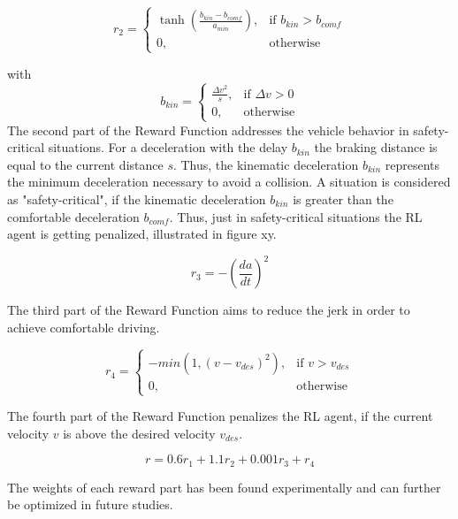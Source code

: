\documentclass[review]{elsarticle}
\begin{document}
\begin{equation}
r_2 = 
\begin{cases}
\tanh\left(\frac{b_{kin}-b_{comf}}{a_{min}}\right),& \text{if } b_{kin}>b_{comf}\\
0,              & \text{otherwise}
\end{cases}
\end{equation}

with
\begin{equation}
b_{kin}=
\begin{cases} \frac{\Delta v^2}{s},& \text{if } \Delta v >0\\
0,              & \text{otherwise}
\end{cases}
\end{equation}
The second part of the Reward Function addresses the vehicle behavior in safety-critical situations.
For a deceleration with the delay $b_{kin}$ the braking distance is equal to the current distance $s$. Thus, the kinematic deceleration $b_{kin}$ represents the minimum deceleration necessary to avoid a collision. A situation is considered as "safety-critical", if the kinematic deceleration $b_{kin}$ is greater than the comfortable deceleration $b_{comf}$. Thus, just in safety-critical situations the RL agent is getting penalized, illustrated in figure xy.

\begin{equation}
r_3 = -\left(\dfrac{da}{dt}\right)^2
\end{equation}

The third part of the Reward Function aims to reduce the jerk in order to achieve comfortable driving. 

\begin{equation}
r_4 =  
\begin{cases} 
 -min\left(1,\left( v - v_{des}\right)^2\right), & \text{if } v>v_{des}\\
0, & \text{otherwise}
\end{cases}             
\end{equation}

The fourth part of the Reward Function penalizes the RL agent, if the current velocity $v$ is above the desired velocity $v_{des}$. 

\begin{equation}
r = 0.6r_1 + 1.1r_2 + 0.001 r_3 + r_4
\end{equation}

The weights of each reward part has been found experimentally and can further be optimized in future studies.
\end{document}
